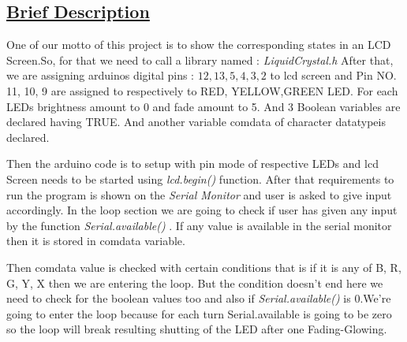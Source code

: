 \documentclass[a4paper]{article}
\begin{document}
\newpage
\subsection{\underline{Brief Description}}
One of our motto of this project is to show the corresponding states in an LCD Screen.So, for that we need to call a library named : \textit{LiquidCrystal.h}
After that, we are assigning arduinos digital pins : $12, 13, 5, 4, 3, 2$ to lcd screen 
and Pin NO. 11, 10, 9 are assigned to respectively to RED, YELLOW,GREEN LED. For each LEDs brightness amount to 0 and fade amount to 5.
And 3 Boolean variables are declared  having TRUE. And another variable comdata of character datatypeis declared.

Then the arduino code is to setup with pin mode of respective LEDs  and lcd Screen needs to be started using \textit{lcd.begin()} function.
After that requirements to run the program is shown on the \textit{Serial Monitor} and user is asked to give input accordingly.
In the loop section we are going to check if user has given any input by the function \textit{Serial.available()} . If any value is available in the serial monitor then it is stored in comdata variable.

Then comdata value is checked with certain conditions that is if it is any of B, R, G, Y, X then we are entering the loop.
But the condition doesn't end here we need to check for the boolean values too and also if \textit{Serial.available()} is 0.We're going to enter the loop because for each turn Serial.available is going to be zero so the loop will break resulting shutting of the LED after one Fading-Glowing.
\end{document}
